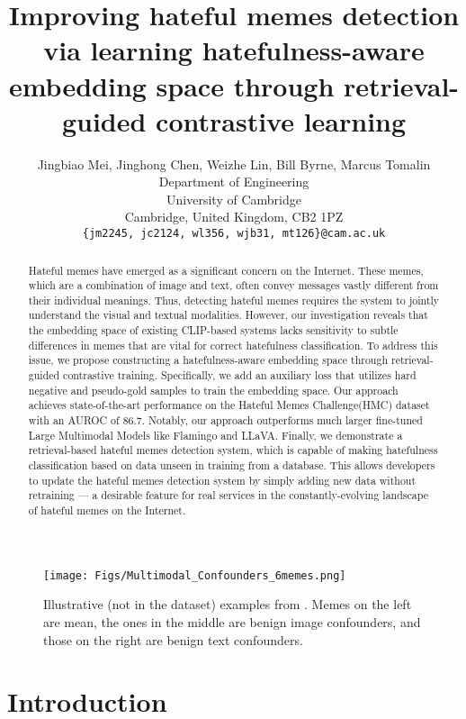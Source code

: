 \documentclass[11pt]{article}
\title{Improving hateful memes detection via learning hatefulness-aware embedding space through retrieval-guided contrastive learning}
\author{Jingbiao Mei, Jinghong Chen, Weizhe Lin, Bill Byrne, Marcus Tomalin \\
Department of Engineering\\
University of Cambridge\\
Cambridge, United Kingdom, CB2 1PZ \\
  \texttt{\{jm2245, jc2124, wl356, wjb31, mt126\}@cam.ac.uk} \\}
\begin{document}
\maketitle

\begin{abstract}
Hateful memes have emerged as a significant concern on the Internet. These memes, which are a combination of image and text, often convey messages vastly different from their individual meanings. Thus, detecting hateful memes requires the system to jointly understand the visual and textual modalities. 
However, our investigation reveals that the embedding space of existing CLIP-based systems lacks sensitivity to subtle differences in memes that are vital for correct hatefulness classification. To address this issue, we propose constructing a hatefulness-aware embedding space through retrieval-guided contrastive training. Specifically, we add an auxiliary loss that utilizes hard negative and pseudo-gold samples to train the embedding space. Our approach achieves state-of-the-art performance on the Hateful Memes Challenge(HMC) dataset with an AUROC of 86.7. Notably, our approach outperforms much larger fine-tuned Large Multimodal Models like Flamingo and LLaVA.
Finally, we demonstrate a retrieval-based hateful memes detection system, which is capable of making hatefulness classification based on data unseen in training from a database. This allows developers to update the hateful memes detection system by simply adding new data without retraining — a desirable feature for real services in the constantly-evolving landscape of hateful memes on the Internet.


\end{abstract}

\begin{figure}[htbp!] 
\centering    
\texttt{[image: Figs/Multimodal\_Confounders\_6memes.png]}
\caption{Illustrative (not in the dataset) examples from \citealt{KielaFBHMC2020}. Memes on the left are mean, the ones in the middle are benign image confounders, and those on the right are benign text confounders.}
\label{fig:conf_HMC}
\end{figure}

\section{Introduction}
\end{document}
